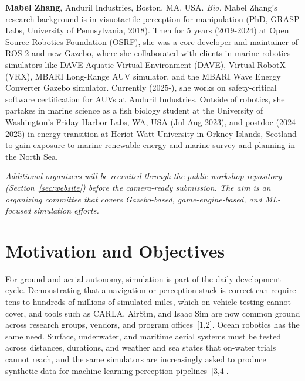 \documentclass[10pt]{article}
\begin{document}
\textbf{Mabel Zhang}, Anduril Industries, Boston, MA, USA.
\emph{Bio.} Mabel Zhang’s research background is in visuotactile perception for manipulation (PhD, GRASP Labs, University of Pennsylvania, 2018). Then for 5 years (2019-2024) at Open Source Robotics Foundation (OSRF), she was a core developer and maintainer of ROS 2 and new Gazebo, where she collaborated with clients in marine robotics simulators like DAVE Aquatic Virtual Environment (DAVE), Virtual RobotX (VRX), MBARI Long-Range AUV simulator, and the MBARI Wave Energy Converter Gazebo simulator. Currently (2025-), she works on safety-critical software certification for AUVs at Anduril Industries. Outside of robotics, she partakes in marine science as a fish biology student at the University of Washington’s Friday Harbor Labs, WA, USA (Jul-Aug 2023), and postdoc (2024-2025) in energy transition at Heriot-Watt University in Orkney Islands, Scotland to gain exposure to marine renewable energy and marine survey and planning in the North Sea.


\emph{Additional organizers will be recruited through the public workshop repository (Section~\ref{sec:website}) before the camera-ready submission. The aim is an organizing committee that covers Gazebo-based, game-engine-based, and ML-focused simulation efforts.}

\section{Motivation and Objectives}

For ground and aerial autonomy, simulation is part of the daily development cycle. Demonstrating that a navigation or perception stack is correct can require tens to hundreds of millions of simulated miles, which on-vehicle testing cannot cover, and tools such as CARLA, AirSim, and Isaac Sim are now common ground across research groups, vendors, and program offices~[1,2]. Ocean robotics has the same need. Surface, underwater, and maritime aerial systems must be tested across distances, durations, and weather and sea states that on-water trials cannot reach, and the same simulators are increasingly asked to produce synthetic data for machine-learning perception pipelines~[3,4].
\end{document}
